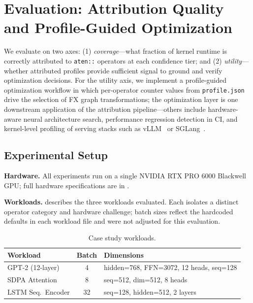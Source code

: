 ﻿\section{Evaluation: Attribution Quality and Profile-Guided Optimization}
\label{sec:experiments}

We evaluate \sys on two axes: (1) \emph{coverage}---what fraction of kernel runtime is
correctly attributed to \texttt{aten::} operators at each confidence tier; and
(2) \emph{utility}---whether attributed profiles provide sufficient signal to ground and
verify optimization decisions.  For the utility axis, we implement a profile-guided
optimization workflow in which per-operator counter values from \texttt{profile.json} drive
the selection of FX graph transformations; the optimization layer is one downstream
application of the attribution pipeline---others include hardware-aware neural architecture
search, performance regression detection in CI, and kernel-level profiling of serving stacks
such as vLLM~\cite{vllm2023} or SGLang~\cite{sglang2024}.

\subsection{Experimental Setup}

\textbf{Hardware.}  All experiments run on a single NVIDIA RTX PRO 6000 Blackwell GPU; full hardware specifications are in .

\textbf{Workloads.}   describes the three workloads evaluated.  Each
isolates a distinct operator category and hardware challenge; batch sizes reflect
the hardcoded defaults in each workload file and were not adjusted for this evaluation.

\begin{table}[h]
\centering
\caption{Case study workloads.}
\label{tab:workloads}
\small
\begin{tabular}{@{}lcp{5.5cm}@{}}
\toprule
\textbf{Workload} & \textbf{Batch} & \textbf{Dimensions} \\
\midrule
GPT-2 (12-layer)   & 4  & hidden=768, FFN=3072, 12 heads, seq=128 \\
SDPA Attention     & 8  & seq=512, dim=512, 8 heads \\
LSTM Seq.\ Encoder & 32 & seq=128, hidden=512, 2 layers \\
\bottomrule
\end{tabular}
\end{table}

